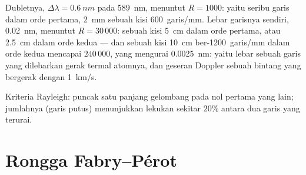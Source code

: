 \begin{example}\label{ex:b2:gratings:sodium}
Dubletnya, $\Delta\lambda = \qty{0.6}{nm}$ pada \qty{589}{nm}, menuntut $R = 1000$: yaitu
seribu garis dalam orde pertama, \qty{2}{mm} sebuah kisi \qty{600}{garis/mm}.
Lebar garisnya sendiri, \qty{0.02}{nm}, menuntut $R = 30\,000$: sebuah kisi \qty{5}{cm}
dalam orde pertama, atau \qty{2.5}{cm} dalam orde kedua --- dan sebuah kisi
\qty{10}{cm} ber-\qty{1200}{garis/mm} dalam orde kedua mencapai
$240\,000$, yang mengurai \qty{0.0025}{nm}: yaitu lebar sebuah garis yang dilebarkan
gerak termal atomnya, dan geseran Doppler sebuah bintang yang bergerak
dengan \qty{1}{km/s}.
\end{example}

\begin{omfigure}

{\small Kriteria Rayleigh: puncak satu panjang gelombang pada nol
pertama yang lain; jumlahnya (garis putus) menunjukkan lekukan sekitar $20\%$ antara
dua garis yang terurai.}
\end{omfigure}

\section{Rongga Fabry--Pérot}

